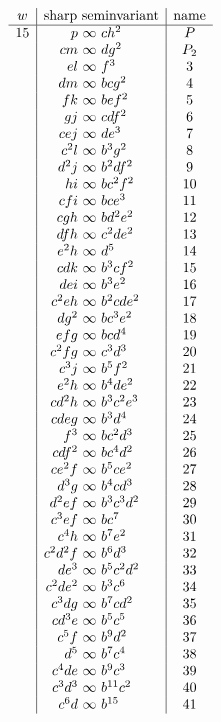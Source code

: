 \documentclass[11pt]{article}
\begin{document}
\[
\begin{array}{c|r@{\ }c@{\ }l|c}
w&\multicolumn{3}{c|}{\hbox{sharp seminvariant}}&\hbox{name}\\ \hline
15&p&\infty&ch^2&P\\
&cm&\infty&dg^2&P_2\\
&el&\infty&f^3&3\\
&dm&\infty&bcg^2&4\\
&fk&\infty&bef^2&5\\
&gj&\infty&cdf^2&6\\
&cej&\infty&de^3&7\\
&c^2l&\infty&b^3g^2&8\\
&d^2j&\infty&b^2df^2&9\\
&hi&\infty&bc^2f^2&10\\
&cfi&\infty&bce^3&11\\
&cgh&\infty&bd^2e^2&12\\
&dfh&\infty&c^2de^2&13\\
&e^2h&\infty&d^5&14\\
&cdk&\infty&b^3cf^2&15\\
&dei&\infty&b^3e^2&16\\
&c^2eh&\infty&b^2cde^2&17\\
&dg^2&\infty&bc^3e^2&18\\
&efg&\infty&bcd^4&19\\
&c^2fg&\infty&c^3d^3&20\\
&c^3j&\infty&b^5f^2&21\\
&e^2h&\infty&b^4de^2&22\\
&cd^2h&\infty&b^3c^2e^3&23\\
&cdeg&\infty&b^3d^4&24\\
&f^3&\infty&bc^2d^3&25\\
&cdf^2&\infty&bc^4d^2&26\\
&ce^2f&\infty&b^5ce^2&27\\
&d^3g&\infty&b^4cd^3&28\\
&d^2ef&\infty&b^3c^3d^2&29\\
&c^3ef&\infty&bc^7&30\\
&c^4h&\infty&b^7e^2&31\\
&c^2d^2f&\infty&b^6d^3&32\\
&de^3&\infty&b^5c^2d^2&33\\
&c^2de^2&\infty&b^3c^6&34\\
&c^3dg&\infty&b^7cd^2&35\\
&cd^3e&\infty&b^5c^5&36\\
&c^5f&\infty&b^9d^2&37\\
&d^5&\infty&b^7c^4&38\\
&c^4de&\infty&b^9c^3&39\\
&c^3d^3&\infty&b^{11}c^2&40\\
&c^6d&\infty&b^{15}&41
\end{array}
\]
\end{document}
